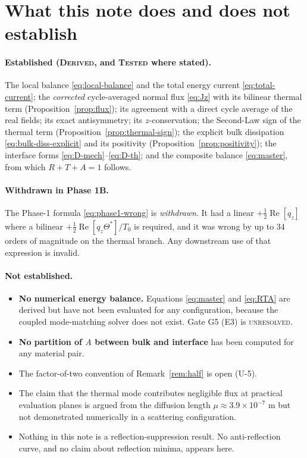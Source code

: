 \documentclass[11pt]{article}
\theoremstyle{plain}
\begin{document}
\section{What this note does and does not establish}
\label{sec:summary}

\paragraph{Established (\textsc{Derived}, and \textsc{Tested} where stated).}
The local balance \eqref{eq:local-balance} and the total energy current
\eqref{eq:total-current}; the \emph{corrected} cycle-averaged normal flux
\eqref{eq:Jz} with its bilinear thermal term
(Proposition~\ref{prop:flux}); its agreement with a direct cycle average of the
real fields; its exact antisymmetry; its $z$-conservation; the Second-Law sign of
the thermal term (Proposition~\ref{prop:thermal-sign}); the explicit bulk
dissipation \eqref{eq:bulk-diss-explicit} and its positivity
(Proposition~\ref{prop:positivity}); the interface forms
\eqref{eq:D-mech}--\eqref{eq:D-th}; and the composite balance
\eqref{eq:master}, from which $R+T+A=1$ follows.

\paragraph{Withdrawn in Phase 1B.}
The Phase-1 formula \eqref{eq:phase1-wrong} is \emph{withdrawn}. It had a linear
$+\tfrac12\operatorname{Re}[q_z]$ where a bilinear
$+\tfrac12\operatorname{Re}[q_z\Theta^*]/T_0$ is required, and it was wrong by up
to $34$ orders of magnitude on the thermal branch. Any downstream use of that
expression is invalid.

\paragraph{Not established.}
\begin{itemize}
  \item \textbf{No numerical energy balance.} Equations \eqref{eq:master} and
        \eqref{eq:RTA} are derived but have not been evaluated for any
        configuration, because the coupled mode-matching solver does not exist.
        Gate G5 (E3) is \textsc{unresolved}.
  \item \textbf{No partition of $A$ between bulk and interface} has been
        computed for any material pair.
  \item The factor-of-two convention of Remark~\ref{rem:half} is open (U-5).
  \item The claim that the thermal mode contributes negligible flux at practical
        evaluation planes is argued from the diffusion length
        $\mu\approx3.9\times10^{-7}$ m but not demonstrated numerically in a
        scattering configuration.
  \item Nothing in this note is a reflection-suppression result. No
        anti-reflection curve, and no claim about reflection minima, appears
        here.
\end{itemize}
\end{document}
